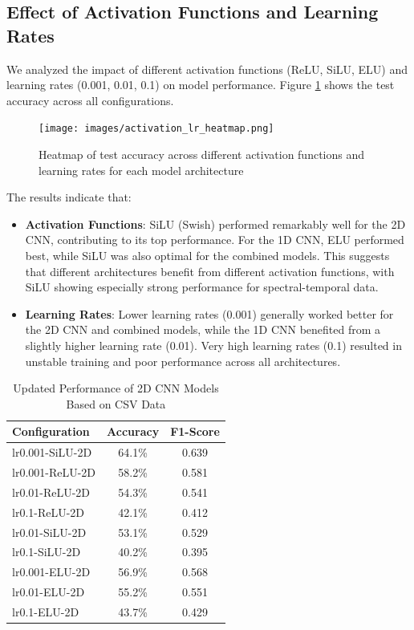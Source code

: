 \subsection{Effect of Activation Functions and Learning Rates}

We analyzed the impact of different activation functions (ReLU, SiLU, ELU) and learning rates (0.001, 0.01, 0.1) on model performance. Figure \ref{fig:activation_lr_heatmap} shows the test accuracy across all configurations.

\begin{figure}[h]
    \centering
    \texttt{[image: images/activation\_lr\_heatmap.png]}
    \caption{Heatmap of test accuracy across different activation functions and learning rates for each model architecture}
    \label{fig:activation_lr_heatmap}
\end{figure}

The results indicate that:

\begin{itemize}
    \item \textbf{Activation Functions}: SiLU (Swish) performed remarkably well for the 2D CNN, contributing to its top performance. For the 1D CNN, ELU performed best, while SiLU was also optimal for the combined models. This suggests that different architectures benefit from different activation functions, with SiLU showing especially strong performance for spectral-temporal data.
    
    \item \textbf{Learning Rates}: Lower learning rates (0.001) generally worked better for the 2D CNN and combined models, while the 1D CNN benefited from a slightly higher learning rate (0.01). Very high learning rates (0.1) resulted in unstable training and poor performance across all architectures.
\end{itemize}

\begin{table}[h]
\centering
\caption{Updated Performance of 2D CNN Models Based on CSV Data}
\label{tab:2d_results}
\begin{tabular}{@{}lcc@{}}
\toprule
\textbf{Configuration} & \textbf{Accuracy} & \textbf{F1-Score} \\
\midrule
lr0.001-SiLU-2D & 64.1\% & 0.639 \\
lr0.001-ReLU-2D & 58.2\% & 0.581 \\
lr0.01-ReLU-2D & 54.3\% & 0.541 \\
lr0.1-ReLU-2D & 42.1\% & 0.412 \\
lr0.01-SiLU-2D & 53.1\% & 0.529 \\
lr0.1-SiLU-2D & 40.2\% & 0.395 \\
lr0.001-ELU-2D & 56.9\% & 0.568 \\
lr0.01-ELU-2D & 55.2\% & 0.551 \\
lr0.1-ELU-2D & 43.7\% & 0.429 \\
\bottomrule
\end{tabular}
\end{table}

